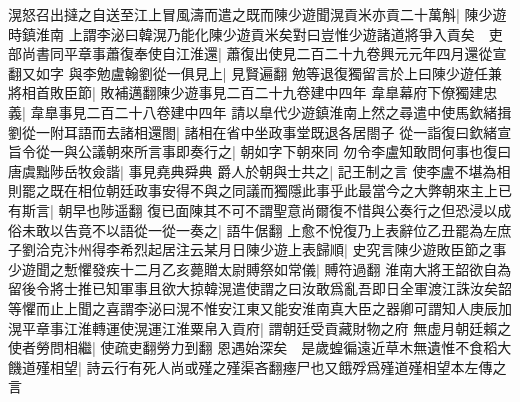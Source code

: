 滉怒召出撻之自送至江上冒風濤而遣之既而陳少遊聞滉貢米亦貢二十萬斛|{
	陳少遊時鎮淮南}
上謂李泌曰韓滉乃能化陳少遊貢米矣對曰豈惟少遊諸道將爭入貢矣　吏部尚書同平章事蕭復奉使自江淮還|{
	蕭復出使見二百二十九卷興元元年四月還從宣翻又如字}
與李勉盧翰劉從一俱見上|{
	見賢遍翻}
勉等退復獨留言於上曰陳少遊任兼將相首敗臣節|{
	敗補邁翻陳少遊事見二百二十九卷建中四年}
韋臯幕府下僚獨建忠義|{
	韋臯事見二百二十八卷建中四年}
請以臯代少遊鎮淮南上然之尋遣中使馬欽緒揖劉從一附耳語而去諸相還閤|{
	諸相在省中坐政事堂既退各居閤子}
從一詣復曰欽緒宣旨令從一與公議朝來所言事即奏行之|{
	朝如字下朝來同}
勿令李盧知敢問何事也復曰唐虞黜陟岳牧僉諧|{
	事見堯典舜典}
爵人於朝與士共之|{
	記王制之言}
使李盧不堪為相則罷之既在相位朝廷政事安得不與之同議而獨隱此事乎此最當今之大弊朝來主上已有斯言|{
	朝早也陟遥翻}
復已面陳其不可不謂聖意尚爾復不惜與公奏行之但恐浸以成俗未敢以告竟不以語從一從一奏之|{
	語牛倨翻}
上愈不悅復乃上表辭位乙丑罷為左庶子劉洽克汴州得李希烈起居注云某月日陳少遊上表歸順|{
	史究言陳少遊敗臣節之事}
少遊聞之慙懼發疾十二月乙亥薨贈太尉賻祭如常儀|{
	賻符過翻}
淮南大將王韶欲自為留後令將士推已知軍事且欲大掠韓滉遣使謂之曰汝敢爲亂吾即日全軍渡江誅汝矣韶等懼而止上聞之喜謂李泌曰滉不惟安江東又能安淮南真大臣之器卿可謂知人庚辰加滉平章事江淮轉運使滉運江淮粟帛入貢府|{
	謂朝廷受貢藏財物之府}
無虚月朝廷賴之使者勞問相繼|{
	使疏吏翻勞力到翻}
恩遇始深矣　是歲蝗徧遠近草木無遺惟不食稻大饑道殣相望|{
	詩云行有死人尚或殣之殣渠吝翻瘞尸也又餓殍爲殣道殣相望本左傳之言}


